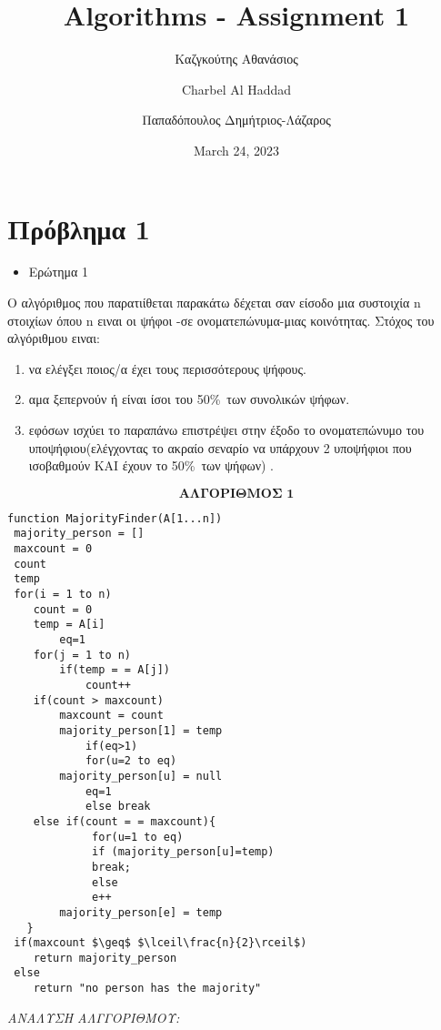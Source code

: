 \documentclass[a4paper]{article}
\title{\textbf{Algorithms - Assignment 1}}
\author{Καζγκούτης Αθανάσιος \and
	    Charbel Al Haddad \and 
	    Παπαδόπουλος Δημήτριος-Λάζαρος
}
\date{March 24, 2023}
\begin{document}
\maketitle
\pagebreak
\section*{Πρόβλημα 1}

\begin{itemize}
\item Ερώτημα 1
\end{itemize}
O αλγόριθμος που παρατιίθεται παρακάτω δέχεται σαν είσοδο μια συστοιχία n στοιχίων όπου n ειναι οι ψήφοι -σε ονοματεπώνυμα-μιας κοινότητας.
Στόχος του αλγόριθμου ειναι:
\begin{enumerate}
    \item να ελέγξει ποιος/α έχει τους περισσότερους ψήφους.
    \item αμα ξεπερνούν ή είναι ίσοι του 50\%\ των συνολικών ψήφων.
    \item εφόσων ισχύει το παραπάνω επιστρέψει στην έξοδο το ονοματεπώνυμο του υποψήφιου(ελέγχοντας το ακραίο σεναρίο να υπάρχουν 2 υποψήφιοι που ισοβαθμούν ΚΑΙ έχουν το 50\%\ των ψήφων) .
  
\end{enumerate}
        $$ \textbf{ΑΛΓΟΡΙΘΜΟΣ 1}$$
\lstset{numbers=left, numbersep=5pt,frame=single,  framexleftmargin=15pt,}

\begin{lstlisting}[mathescape]
function MajorityFinder(A[1...n])
 majority_person = []
 maxcount = 0
 count
 temp
 for(i = 1 to n)
 	count = 0
 	temp = A[i]
        eq=1
 	for(j = 1 to n)
 		if(temp = = A[j])
 			count++
 	if(count > maxcount)
 		maxcount = count
 		majority_person[1] = temp
            if(eq>1)
            for(u=2 to eq)
 		majority_person[u] = null
            eq=1
            else break
 	else if(count = = maxcount){
             for(u=1 to eq)
             if (majority_person[u]=temp)
             break;
             else
             e++
 		majority_person[e] = temp
   }
 if(maxcount $\geq$ $\lceil\frac{n}{2}\rceil$)
 	return majority_person
 else 
 	return "no person has the majority"
\end{lstlisting}
\textit{ΑΝΑΛΥΣΗ ΑΛΓΓΟΡΙΘΜΟΥ:}
\end{document}
